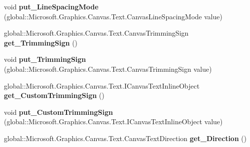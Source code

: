 \begin{DoxyCompactItemize}
\mbox{\label{interface_microsoft_1_1_graphics_1_1_canvas_1_1_text_1_1_i_canvas_text_format_a1a3230a7d36b210e60927960396f0c69}} 
void {\bfseries put\+\_\+\+Line\+Spacing\+Mode} (global\+::\+Microsoft.\+Graphics.\+Canvas.\+Text.\+Canvas\+Line\+Spacing\+Mode value)
\item 
\mbox{\label{interface_microsoft_1_1_graphics_1_1_canvas_1_1_text_1_1_i_canvas_text_format_a470488d4549d1bc276b39772375c8064}} 
global\+::\+Microsoft.\+Graphics.\+Canvas.\+Text.\+Canvas\+Trimming\+Sign {\bfseries get\+\_\+\+Trimming\+Sign} ()
\item 
\mbox{\label{interface_microsoft_1_1_graphics_1_1_canvas_1_1_text_1_1_i_canvas_text_format_ac8017ec2b958d4f84c22ffd8b24319e5}} 
void {\bfseries put\+\_\+\+Trimming\+Sign} (global\+::\+Microsoft.\+Graphics.\+Canvas.\+Text.\+Canvas\+Trimming\+Sign value)
\item 
\mbox{\label{interface_microsoft_1_1_graphics_1_1_canvas_1_1_text_1_1_i_canvas_text_format_a66d3e1355a4ce968e56b2239fdcd9fc5}} 
global\+::\+Microsoft.\+Graphics.\+Canvas.\+Text.\+I\+Canvas\+Text\+Inline\+Object {\bfseries get\+\_\+\+Custom\+Trimming\+Sign} ()
\item 
\mbox{\label{interface_microsoft_1_1_graphics_1_1_canvas_1_1_text_1_1_i_canvas_text_format_aefe2238d3d79706b8cfa6e70171a651c}} 
void {\bfseries put\+\_\+\+Custom\+Trimming\+Sign} (global\+::\+Microsoft.\+Graphics.\+Canvas.\+Text.\+I\+Canvas\+Text\+Inline\+Object value)
\item 
\mbox{\label{interface_microsoft_1_1_graphics_1_1_canvas_1_1_text_1_1_i_canvas_text_format_ad08083df7e2d44e9c7e2515e41680d6c}} 
global\+::\+Microsoft.\+Graphics.\+Canvas.\+Text.\+Canvas\+Text\+Direction {\bfseries get\+\_\+\+Direction} ()
\item 
\mbox{\label{interface_microsoft_1_1_graphics_1_1_canvas_1_1_text_1_1_i_canvas_text_format_ae3d774c44911dc8c0de1180ace93d9a4}} 

\end{DoxyCompactItemize}

